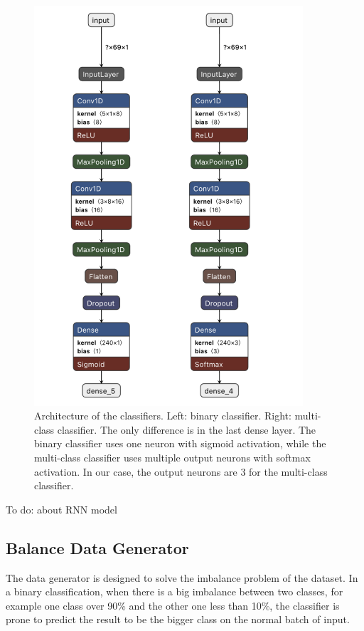 \begin{figure}[ht]
    \centering
    \includegraphics[width= 10cm]{figures/models.png}
        \caption{Architecture of the classifiers. Left: binary classifier. Right: multi-class classifier. 
        The only difference is in the last dense layer. The binary classifier uses one neuron with sigmoid activation, 
        while the multi-class classifier uses multiple output neurons with softmax activation. In our case, the output neurons are 3 for the multi-class classifier.}
    \label{fig:models}
\end{figure}

To do: about RNN model

\subsection{Balance Data Generator}

The data generator is designed to solve the imbalance problem of the dataset. In a binary classification, 
when there is a big imbalance between two classes, for example one class over 90\% and the other one less than 10\%,
the classifier is prone to predict the result to be the bigger class on the normal batch of input. 

